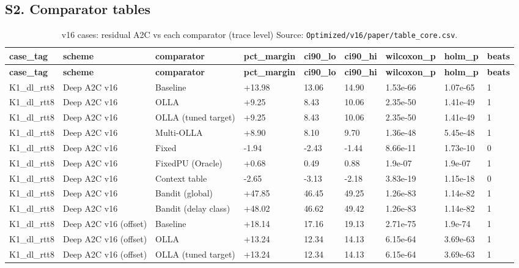 \documentclass[10pt]{article}
\begin{document}
\begin{landscape}
\section{S2. Comparator tables}
\tiny
\setlength{\tabcolsep}{2pt}
\begin{longtable}{@{}lllllllll@{}}
\caption{v16 cases: residual A2C vs each comparator (trace level) Source: \texttt{Optimized/v16/paper/table\_core.csv}.}\\
\toprule
\textbf{case\_tag} & \textbf{scheme} & \textbf{comparator} & \textbf{pct\_margin} & \textbf{ci90\_lo} & \textbf{ci90\_hi} & \textbf{wilcoxon\_p} & \textbf{holm\_p} & \textbf{beats} \\
\midrule
\endfirsthead
\toprule
\textbf{case\_tag} & \textbf{scheme} & \textbf{comparator} & \textbf{pct\_margin} & \textbf{ci90\_lo} & \textbf{ci90\_hi} & \textbf{wilcoxon\_p} & \textbf{holm\_p} & \textbf{beats} \\
\midrule
\endhead
K1\_dl\_rtt8 & Deep A2C v16 & Baseline & +13.98 & 13.06 & 14.90 & 1.53e-66 & 1.07e-65 & 1 \\
K1\_dl\_rtt8 & Deep A2C v16 & OLLA & +9.25 & 8.43 & 10.06 & 2.35e-50 & 1.41e-49 & 1 \\
K1\_dl\_rtt8 & Deep A2C v16 & OLLA (tuned target) & +9.25 & 8.43 & 10.06 & 2.35e-50 & 1.41e-49 & 1 \\
K1\_dl\_rtt8 & Deep A2C v16 & Multi-OLLA & +8.90 & 8.10 & 9.70 & 1.36e-48 & 5.45e-48 & 1 \\
K1\_dl\_rtt8 & Deep A2C v16 & Fixed & -1.94 & -2.43 & -1.44 & 8.66e-11 & 1.73e-10 & 0 \\
K1\_dl\_rtt8 & Deep A2C v16 & FixedPU (Oracle) & +0.68 & 0.49 & 0.88 & 1.9e-07 & 1.9e-07 & 1 \\
K1\_dl\_rtt8 & Deep A2C v16 & Context table & -2.65 & -3.13 & -2.18 & 3.83e-19 & 1.15e-18 & 0 \\
K1\_dl\_rtt8 & Deep A2C v16 & Bandit (global) & +47.85 & 46.45 & 49.25 & 1.26e-83 & 1.14e-82 & 1 \\
K1\_dl\_rtt8 & Deep A2C v16 & Bandit (delay class) & +48.02 & 46.62 & 49.42 & 1.26e-83 & 1.14e-82 & 1 \\
K1\_dl\_rtt8 & Deep A2C v16 (offset) & Baseline & +18.14 & 17.16 & 19.13 & 2.71e-75 & 1.9e-74 & 1 \\
K1\_dl\_rtt8 & Deep A2C v16 (offset) & OLLA & +13.24 & 12.34 & 14.13 & 6.15e-64 & 3.69e-63 & 1 \\
K1\_dl\_rtt8 & Deep A2C v16 (offset) & OLLA (tuned target) & +13.24 & 12.34 & 14.13 & 6.15e-64 & 3.69e-63 & 1 \\

\end{longtable}
\end{landscape}
\end{document}
